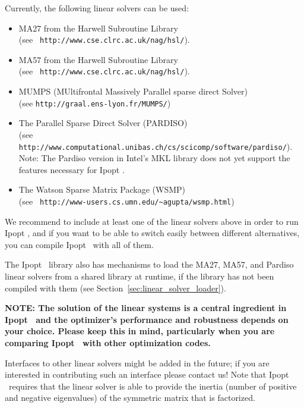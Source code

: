 \documentclass[10pt]{article}
\newcommand{\Ipopt}{{\sc Ipopt }}
\begin{document}
\begin{itemize}
  Currently, the following linear solvers can be used:
  \begin{itemize}
  \item MA27 from the Harwell Subroutine Library\\ (see {\tt
      http://www.cse.clrc.ac.uk/nag/hsl/}).
  \item MA57 from the Harwell Subroutine Library\\ (see {\tt
      http://www.cse.clrc.ac.uk/nag/hsl/}).
  \item MUMPS (MUltifrontal Massively Parallel sparse direct Solver)\\
    (see {\tt http://graal.ens-lyon.fr/MUMPS/})
  \item The Parallel Sparse Direct Solver (PARDISO)\\ (see {\tt
      http://www.computational.unibas.ch/cs/scicomp/software/pardiso/}).\\
    Note: The Pardiso version in Intel's MKL library does not yet
    support the features necessary for \Ipopt.
  \item The Watson Sparse Matrix Package (WSMP)\\ (see {\tt
       http://www-users.cs.umn.edu/\verb|~|agupta/wsmp.html})
  \end{itemize}
  We recommend to include at least one of the linear solvers above in
  order to run \Ipopt, and if you want to be able to switch easily
  between different alternatives, you can compile \Ipopt\ with all of
  them.

  The \Ipopt\ library also has mechanisms to load the MA27, MA57, and
  Pardiso linear solvers from a shared library at runtime, if the
  library has not been compiled with them (see
  Section~\ref{sec:linear_solver_loader}).

  \textbf{NOTE: The solution of the linear systems is a central
    ingredient in \Ipopt\ and the optimizer's performance and
    robustness depends on your choice.  Please keep this in mind,
    particularly when you are comparing \Ipopt\ with other
    optimization codes.}

  Interfaces to other linear solvers might be added in the future; if
  you are interested in contributing such an interface please contact
  us!  Note that \Ipopt\ requires that the linear solver is able to
  provide the inertia (number of positive and negative eigenvalues) of
  the symmetric matrix that is factorized.


\end{itemize}
\end{document}

